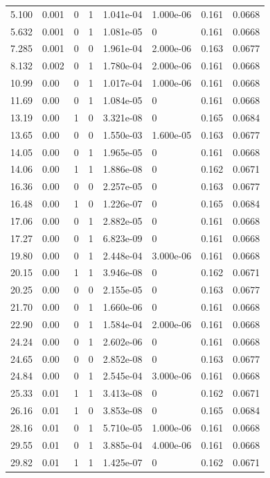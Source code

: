 \documentclass[preview]{standalone}
\begin{document}
{{\begin{tabular}{L{1.2cm}C{1.2cm} C{0.3cm}C{0.5cm} C{1.4cm}C{1.4cm} C{1.4cm}C{1.4cm}}
  5.100  &  0.001  & 0     &  1 &  1.041e-04  & 1.000e-06  & 0.161 &  0.0668   \\ 
  5.632  &  0.001  & 0     &  1 &  1.081e-05  & 0  & 0.161 &  0.0668   \\ 
  7.285  &  0.001  & 0     &  0 &  1.961e-04  & 2.000e-06  & 0.163 &  0.0677   \\ 
  8.132  &  0.002  & 0     &  1 &  1.780e-04  & 2.000e-06  & 0.161 &  0.0668   \\ 
  10.99  &  0.00  & 0     &  1 &  1.017e-04  & 1.000e-06  & 0.161 &  0.0668   \\ 
  11.69  &  0.00  & 0     &  1 &  1.084e-05  & 0  & 0.161 &  0.0668   \\ 
  13.19  &  0.00  & 1     &  0 &  3.321e-08  & 0  & 0.165 &  0.0684   \\ 
  13.65  &  0.00  & 0     &  0 &  1.550e-03  & 1.600e-05  & 0.163 &  0.0677   \\ 
  14.05  &  0.00  & 0     &  1 &  1.965e-05  & 0  & 0.161 &  0.0668   \\ 
  14.06  &  0.00  & 1     &  1 &  1.886e-08  & 0  & 0.162 &  0.0671   \\ 
  16.36  &  0.00  & 0     &  0 &  2.257e-05  & 0  & 0.163 &  0.0677   \\ 
  16.48  &  0.00  & 1     &  0 &  1.226e-07  & 0  & 0.165 &  0.0684   \\ 
  17.06  &  0.00  & 0     &  1 &  2.882e-05  & 0  & 0.161 &  0.0668   \\ 
  17.27  &  0.00  & 0     &  1 &  6.823e-09  & 0  & 0.161 &  0.0668   \\ 
  19.80  &  0.00  & 0     &  1 &  2.448e-04  & 3.000e-06  & 0.161 &  0.0668   \\ 
  20.15  &  0.00  & 1     &  1 &  3.946e-08  & 0  & 0.162 &  0.0671   \\ 
  20.25  &  0.00  & 0     &  0 &  2.155e-05  & 0  & 0.163 &  0.0677   \\ 
  21.70  &  0.00  & 0     &  1 &  1.660e-06  & 0  & 0.161 &  0.0668   \\ 
  22.90  &  0.00  & 0     &  1 &  1.584e-04  & 2.000e-06  & 0.161 &  0.0668   \\ 
  24.24  &  0.00  & 0     &  1 &  2.602e-06  & 0  & 0.161 &  0.0668   \\ 
  24.65  &  0.00  & 0     &  0 &  2.852e-08  & 0  & 0.163 &  0.0677   \\ 
  24.84  &  0.00  & 0     &  1 &  2.545e-04  & 3.000e-06  & 0.161 &  0.0668   \\ 
  25.33  &  0.01  & 1     &  1 &  3.413e-08  & 0  & 0.162 &  0.0671   \\ 
  26.16  &  0.01  & 1     &  0 &  3.853e-08  & 0  & 0.165 &  0.0684   \\ 
  28.16  &  0.01  & 0     &  1 &  5.710e-05  & 1.000e-06  & 0.161 &  0.0668   \\ 
  29.55  &  0.01  & 0     &  1 &  3.885e-04  & 4.000e-06  & 0.161 &  0.0668   \\ 
  29.82  &  0.01  & 1     &  1 &  1.425e-07  & 0  & 0.162 &  0.0671   \\ 
\hline 
\end{tabular} 

}}
\end{document}
